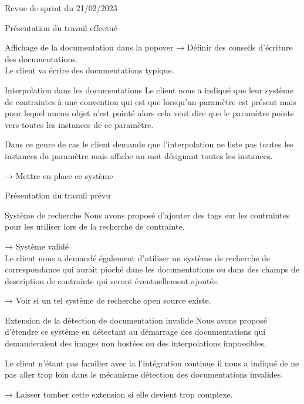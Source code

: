 \documentclass[]{article}
\begin{document}
{\begin{section}{Revue de sprint du 21/02/2023}
\begin{subsection}{Présentation du travail effectué}
\begin{subsubsection}{Affichage de la documentation dans la popover}
         → Définir des conseils d’écriture des documentations.
         \\[5mm]
         Le client va écrire des documentations typique.
     \end{subsubsection}

     \newpage

     \begin{subsubsection}{Interpolation dans les documentations}
         Le client nous a indiqué que leur système de contraintes à une convention qui est que lorsqu’un paramètre est présent mais pour lequel aucun objet n’est pointé alors cela veut dire que le paramètre pointe vers toutes les instances de ce paramètre.

         Dans ce genre de cas le client demande que l’interpolation ne liste pas toutes les instances du paramètre mais affiche un mot désignant toutes les instances.

         → Mettre en place ce système
     \end{subsubsection}
 \end{subsection}

 \begin{subsection}{Présentation du travail prévu}
     \begin{subsubsection}{Système de recherche}
         Nous avons proposé d’ajouter des tags sur les contraintes pour les utiliser lors de la recherche de contrainte.

         → Système validé
         \\[5mm]
         Le client nous a demandé également d’utiliser un système de recherche de correspondance qui aurait pioché dans les documentations ou dans des champs de description de contrainte qui seront éventuellement ajoutés.

         → Voir si un tel système de recherche open source existe.
     \end{subsubsection}

     \begin{subsubsection}{Extension de la détection de documentation invalide}
         Nous avons proposé d’étendre ce système en détectant au démarrage des documentations qui demanderaient des images non hostées ou des interpolations impossibles.

         Le client n’étant pas familier avec la l'intégration continue il nous a indiqué de ne pas aller trop loin dans le mécanisme détection des documentations invalides.

         → Laisser tomber cette extension si elle devient trop complexe.
     \end{subsubsection}
 \end{subsection}


\end{section}}
\end{document}
